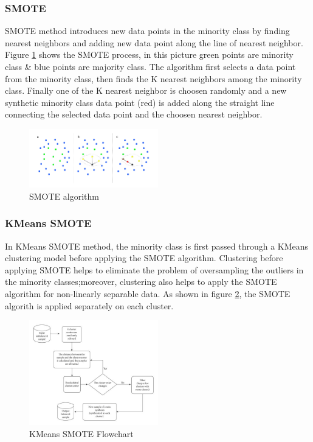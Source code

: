 \documentclass[twoside,11pt,a4paper]{article}
\begin{document}
\subsubsection{\acf{SMOTE}}
\acs{SMOTE} method introduces new data points in the minority class by finding nearest neighbors and adding new data point along the line of nearest neighbor. Figure \ref{fig:smote} shows the \acs{SMOTE} process, in this picture green points are minority class \&  blue points are majority class. The algorithm first selects a data point from the minority class, then finds the K nearest neighbors among the minority class. Finally one of the K nearest neighbor is choosen randomly and a new synthetic minority class data point (red) is added along the straight line connecting the selected data point and the choosen nearest neighbor.

\begin{figure}[ht]
	\centering
	\includegraphics[width=0.5\textwidth]{smote}
	\caption[\acs{SMOTE} algorithm]{\acs{SMOTE} algorithm \citep{schubachimbalance}}
	\label{fig:smote}
\end{figure}
\subsubsection{KMeans \acs{SMOTE}}
In KMeans \acs{SMOTE} method, the minority class is first passed through a KMeans clustering model before applying the \acs{SMOTE} algorithm. Clustering before applying \acs{SMOTE} helps to eliminate the problem of oversampling the outliers in the minority classes;moreover, clustering also helps to apply the \acs{SMOTE} algorithm for non-linearly separable data. As shown in  figure \ref{fig:kmeans_smote}, the SMOTE algorith is applied separately on each cluster.
\begin{figure}[ht]
	\centering
	\includegraphics[width=0.5\textwidth]{kmeans_smote}
	\caption[KMeans \acs{SMOTE} algorithm]{KMeans \acs{SMOTE} Flowchart \citep{chen2021research}}
	\label{fig:kmeans_smote}
\end{figure}
\end{document}
